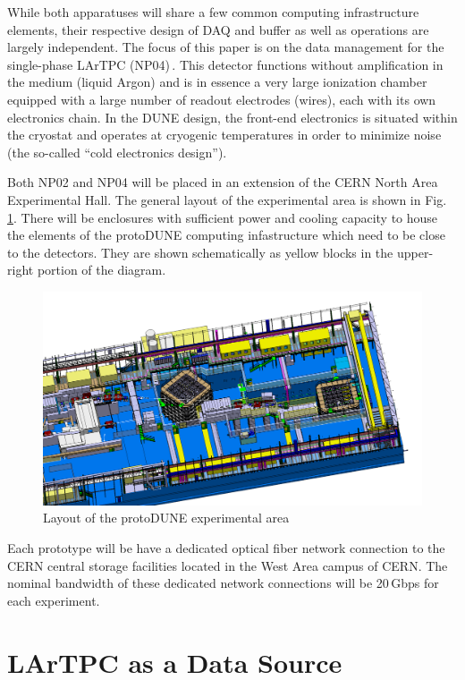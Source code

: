 \documentclass[a4paper]{jpconf}
\newcommand{\pd}{protoDUNE\xspace}
\begin{document}
While both apparatuses will share a few common computing infrastructure elements, their
respective design of DAQ and buffer as well as operations are largely independent.
The focus of this paper is on the data management for the
single-phase LArTPC (NP04)\,\cite{np04}. This detector  functions without amplification
in the medium (liquid Argon) and is in essence a very large ionization chamber equipped with
a large number of readout electrodes (wires), each with its own electronics chain.
In the DUNE design, the front-end electronics is situated within the cryostat and operates at cryogenic
temperatures in order to minimize noise (the so-called ``cold electronics design'').

Both NP02 and NP04 will be placed in an extension of the CERN North Area Experimental Hall.
The general layout of the experimental area is shown in Fig.\,\ref{fig:np02np04}.
There will be enclosures with sufficient power and cooling capacity to house
the elements of the \pd computing infastructure which need to be close to the detectors.
They are shown schematically as yellow blocks in the upper-right portion of the diagram.
\begin{figure}[tbh]
\centering\includegraphics[width=\linewidth]{figures/np02np04.png}
\caption{\label{fig:np02np04}Layout of the \pd experimental area}
\end{figure}

\noindent Each prototype will be have a dedicated optical fiber network connection to
the CERN central storage facilities located in the West Area campus of CERN. The nominal
bandwidth of these dedicated network connections will be 20\,Gbps for each experiment.


\section{LArTPC as a Data Source}
\end{document}
